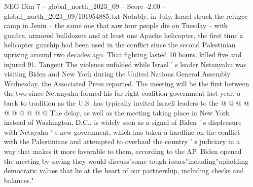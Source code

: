 \begin{textsample}{NEG Dim 7 – global\_north\_2023\_09 – Score -2.00 – global\_north\_2023\_09/101954885.txt}
Notably, in July, Israel struck the refugee camp in Jenin -- the same one that saw four people die on Tuesday -- with gunfire, armored bulldozers and at least one Apache helicopter, the first time a helicopter gunship had been used in the conflict since the second Palestinian uprising around two decades ago.
That fighting lasted 10 hours, killed five and injured 91.
Tangent The violence unfolded while Israel ' s leader Netanyahu was visiting Biden and New York during the United Nations General Assembly Wednesday, the Associated Press reported.
The meeting will be the first between the two since Netanyahu formed his far-right coalition government last year, a buck to tradition as the U.S. has typically invited Israeli leaders to the @ @ @ @ @ @ @ @ @ @ The delay, as well as the meeting taking place in New York instead of Washington, D.C., is widely seen as a signal of Biden ' s displeasure with Netayahu ' s new government, which has taken a hardline on the conflict with the Palestinians and attempted to overhaul the country ' s judiciary in a way that makes it more favorable to them, according to the AP.
Biden opened the meeting by saying they would discuss"some tough issues"including"upholding democratic values that lie at the heart of our partnership, including checks and balances."

\end{textsample}

